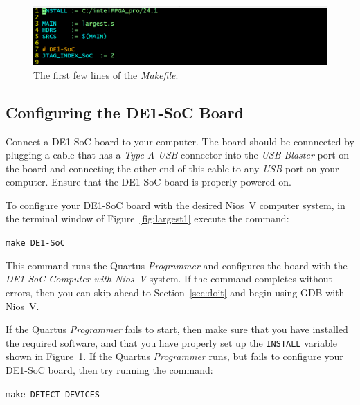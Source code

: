 \documentclass[11pt, twoside, pdftex]{article}
\begin{document}
{\begin{figure}[h]
    \begin{center}
        \includegraphics[scale=.5]{figures/firstfew.png}
        \caption{The first few lines of the {\it Makefile}.}
        \label{fig:firstfew}
    \end{center}
\end{figure}

\subsection{Configuring the DE1-SoC Board}

Connect a DE1-SoC board to your computer. The board should be connnected by plugging
a cable that has a {\it Type-A USB} connector into the {\it USB Blaster} port on the board 
and connecting the other end of this cable to any {\it USB} port on your computer. Ensure 
that the DE1-SoC board is properly powered on.

To configure your DE1-SoC board with the desired Nios~V computer system, in the terminal
window of Figure~\ref{fig:largest1} execute the command:

\texttt{make DE1-SoC} 

This command runs the Quartus {\it Programmer} and configures the board with the 
{\it DE1-SoC Computer with Nios~V} system. If the command completes without errors, then you 
can skip ahead to Section~\ref{sec:doit} and begin using GDB with Nios~V. 

If the Quartus {\it Programmer} fails to start, then make sure that you have installed the
required software, and that you have properly set up the \texttt{INSTALL} variable shown
in Figure~\ref{fig:firstfew}. If the Quartus {\it Programmer} runs, but fails to configure 
your DE1-SoC board, then try running the command:

\texttt{make DETECT\_DEVICES}

}
\end{document}
